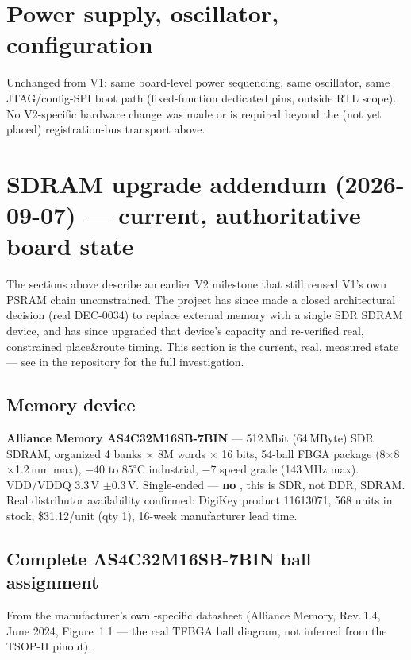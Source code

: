 \section{Power supply, oscillator, configuration}
Unchanged from V1: same board-level power sequencing, same oscillator,
same JTAG/config-SPI boot path (fixed-function dedicated pins, outside
RTL scope). No V2-specific hardware change was made or is required
beyond the (not yet placed) registration-bus transport above.

\section{SDRAM upgrade addendum (2026-09-07) --- current, authoritative
board state}
\label{sec:sdram-addendum}
\begin{fnwarn}
The sections above describe an earlier V2 milestone that still reused
V1's own PSRAM chain unconstrained. The project has since made a
closed architectural decision (real  DEC-0034) to
replace external memory with a single SDR SDRAM device, and has since
upgraded that device's capacity and re-verified real, constrained
place\&route timing. This section is the current, real, measured state
--- see  in the
repository for the full investigation.
\end{fnwarn}

\subsection{Memory device}
\textbf{Alliance Memory AS4C32M16SB-7BIN} --- 512\,Mbit (64\,MByte) SDR
SDRAM, organized 4 banks $\times$ 8M words $\times$ 16 bits, 54-ball
FBGA package (8$\times$8$\times$1.2\,mm max), $-40$ to $85^{\circ}$C
industrial, $-7$ speed grade (143\,MHz max). VDD/VDDQ 3.3\,V $\pm$0.3\,V.
Single-ended  --- \textbf{no }, this is SDR, not
DDR, SDRAM. Real distributor availability confirmed: DigiKey product
11613071, 568 units in stock, \$31.12/unit (qty 1), 16-week
manufacturer lead time.

\subsection{Complete AS4C32M16SB-7BIN ball assignment}
From the manufacturer's own -specific datasheet (Alliance
Memory, Rev.\,1.4, June 2024, Figure~1.1 --- the real TFBGA ball
diagram, not inferred from the TSOP-II  pinout).

